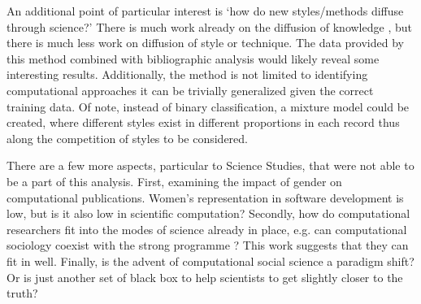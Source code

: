 \documentclass[12pt, a4paper]{article}
\begin{document}
An additional point of particular interest is `how do new styles/methods diffuse through science?' There is much work already on the diffusion of knowledge \citep{griliches1960hybrid} \citep{crane1972invisible} \citep{evans2010industry}, but there is much less work on diffusion of style or technique. The data provided by this method combined with bibliographic analysis would likely reveal some interesting results. Additionally, the method is not limited to identifying computational approaches it can be trivially generalized given the correct training data. Of note, instead of binary classification, a mixture model could be created, where different styles exist in different proportions in each record thus along the competition of styles to be considered.

There are a few more aspects, particular to Science Studies, that were not able to be a part of this analysis. First, examining the impact of gender on computational publications. Women's representation in software development is low, but is it also low in scientific computation? Secondly, how do computational researchers fit into the modes of science already in place, e.g. can computational sociology coexist with the strong programme \citep{bloor1976strong}? This work suggests that they can fit in well. Finally, is the advent of computational social science a paradigm shift? Or is just another set of black box to help scientists to get slightly closer to the truth?

\newpage
\singlespacing
\setcounter{page}{1}
{}



\appendix
\end{document}
